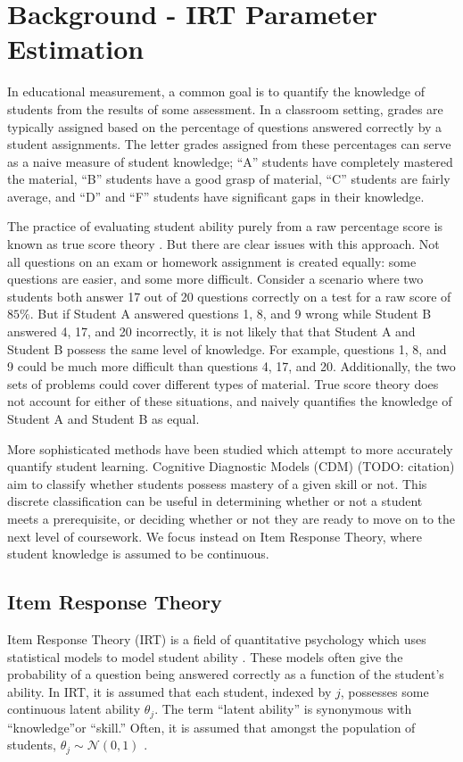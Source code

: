 \chapter{Background - IRT Parameter Estimation} \label{ch:irt_background}
In educational measurement, a common goal is to quantify the knowledge of students from the results of some assessment. In a classroom setting, grades are typically assigned based on the percentage of questions answered correctly by a student assignments. The letter grades assigned from these percentages can serve as a naive measure of student knowledge; ``A'' students have completely mastered the material, ``B'' students have a good grasp of material, ``C'' students are fairly average, and ``D'' and ``F'' students have significant gaps in their knowledge.

The practice of evaluating student ability purely from a raw percentage score is known as true score theory \cite{thissen}. But there are clear issues with this approach. Not all questions on an exam or homework assignment is created equally: some questions are easier, and some more difficult. Consider a scenario where two students both answer 17 out of 20 questions correctly on a test for a raw score of $85\%$. But if Student A answered questions 1, 8, and 9 wrong while Student B answered 4, 17, and 20 incorrectly, it is not likely that that Student A and Student B possess the same level of knowledge. For example, questions 1, 8, and 9 could be much more difficult than questions 4, 17, and 20. Additionally, the two sets of problems could cover different types of material. True score theory does not account for either of these situations, and naively quantifies the knowledge of Student A and Student B as equal.

More sophisticated methods have been studied which attempt to more accurately quantify student learning. Cognitive Diagnostic Models (CDM) (TODO: citation) aim to classify whether students possess mastery of a given skill or not. This discrete classification can be useful in determining whether or not a student meets a prerequisite, or deciding whether or not they are ready to move on to the next level of coursework. We focus instead on Item Response Theory, where student knowledge is assumed to be continuous.

\section{Item Response Theory}
Item Response Theory (IRT) is a field of quantitative psychology which uses statistical models to model student ability \cite{lord1968}. These models often give the probability of a question being answered correctly as a function of the student's ability. In IRT, it is assumed that each student, indexed by $j$, possesses some continuous latent ability $\theta_j$. The term ``latent ability'' is synonymous with ``knowledge''or ``skill.'' Often, it is assumed that amongst the population of students, $\theta_j \sim \mathcal{N}(0,1)$ \cite{thissen}. 

